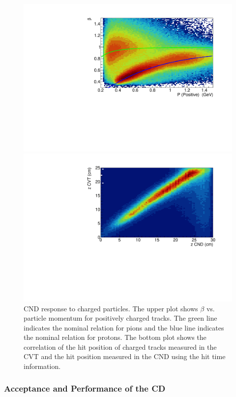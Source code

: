 \documentclass[final,3p,twocolumn]{elsarticle}
\begin{document}
\begin{figure}[t!]
\centerline{\includegraphics[width=1.1\columnwidth]{CND-betaP.pdf}}
\centerline{\includegraphics[width=1.1\columnwidth]{CND-z.pdf}}
\caption{CND response to charged particles. The upper plot shows $\beta$ vs. particle momentum for positively
  charged tracks. The green line indicates the nominal relation for pions and the blue line indicates the nominal relation
  for protons. The bottom plot shows the correlation of the hit position of charged tracks measured in the CVT and the
  hit position measured in the CND using the hit time information.}
\label{cnd-performance}
\end{figure}

\subsubsection{Acceptance and Performance of the CD} 
\end{document}
